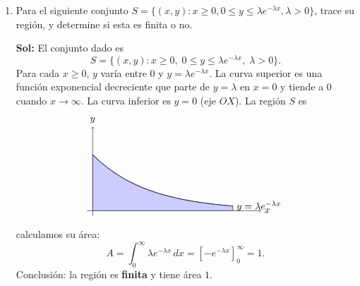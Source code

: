 \documentclass[letterpaper,12pt]{article}
\theoremstyle{plain}
\theoremstyle{definition}
\begin{document}
\begin{enumerate}
\begin{enumerate}
$\therefore \displaystyle \int_{0}^{1} \frac{1}{x(x+\sqrt{x})} \, dx$ diverge $\displaystyle \implies \int_{0}^{\infty} \frac{1}{x(x+\sqrt{x})} \, dx$ también.
\color{black}
        
        \item $\displaystyle \int_{0}^\infty \frac{\arctan(x)}{x^2} \, dx$

\color{blue}
\textbf{Sol:} $\displaystyle \int_{0}^{\infty} \frac{\arctan(x)}{x^2} \, dx \ \text{es} \ \text{mixta}$
\noindent $\displaystyle = \underbrace{\int_{0}^{1} \frac{\arctan(x)}{x^2} \, dx}_{\text{2\textsuperscript{a} especie}} + \underbrace{\int_{1}^{\infty} \frac{\arctan(x)}{x^2} \, dx}_{\text{1\textsuperscript{a} especie}}$
\quad 

\begin{minipage}[t]{0.4\textwidth}
\textit{En cociente el límite es $x \to 0$ pues en 0 explota la función.}
\end{minipage}
\noindent Veamos esta (la de 2\textsuperscript{a} especie),

usemos \textbf{criterio del cociente}:
\[
\lim_{x \to 0} \frac{\left( \frac{\arctan(x)}{x^2} \right)}{\frac{1}{x}} = \lim_{x \to 0} \frac{\arctan(x)}{x} \stackrel{L'H}{=} \lim_{x \to 0} \frac{\frac{1}{x^2+1}}{1} = 1 \neq 0
\]
\noindent Por lo tanto $\displaystyle \int_{0}^{1} \frac{\arctan(x)}{x^2} \, dx$ \textbf{diverge} ya que $\displaystyle \int_{0}^{1} \frac{1}{x} \, dx$ \textbf{diverge}. $\implies \displaystyle \int_{0}^{\infty} \frac{\arctan(x)}{x^2} \, dx$ también \textbf{diverge}.
\color{black}
        
    \end{enumerate}

\item Para el siguiente conjunto $S = \{(x, y) : x \geq 0, 0 \leq y \leq \lambda e^{-\lambda x}, \lambda > 0\}$, trace su región, y determine si esta es finita o no.

\color{blue}
\textbf{Sol:} El conjunto dado es
\[
S = \{(x,y) : x \ge 0, \; 0 \le y \le \lambda e^{-\lambda x}, \; \lambda>0\}.
\]
Para cada $x \ge 0$, $y$ varía entre $0$ y $y=\lambda e^{-\lambda x}$. La curva superior es una función exponencial decreciente que parte de $y=\lambda$ en $x=0$ y tiende a $0$ cuando $x\to\infty$. La curva inferior es $y=0$ (eje $OX$).
La región $S$ es
\[
\begin{tikzpicture}[scale=1.0]
\draw[->] (-0.2,0) -- (6,0) node[right] {$x$};
\draw[->] (0,-0.2) -- (0,3) node[above] {$y$};
\draw[thick,domain=0:5,smooth,samples=100] plot (\x,{2*exp(-0.5*\x)}) node[right] {$y=\lambda e^{-\lambda x}$};
\draw[fill=blue!20,domain=0:5,smooth,samples=100] 
  plot (\x,{2*exp(-0.5*\x)}) -- (5,0) -- (0,0) -- cycle;
\end{tikzpicture}
\]
calculamos su área:
\[
A = \int_0^{\infty} \lambda e^{-\lambda x}\,dx = \left[-e^{-\lambda x}\right]_0^{\infty} = 1.
\]
Conclusión: la región es \textbf{finita} y tiene área $1$.
\color{black}


\end{enumerate}
\end{document}
